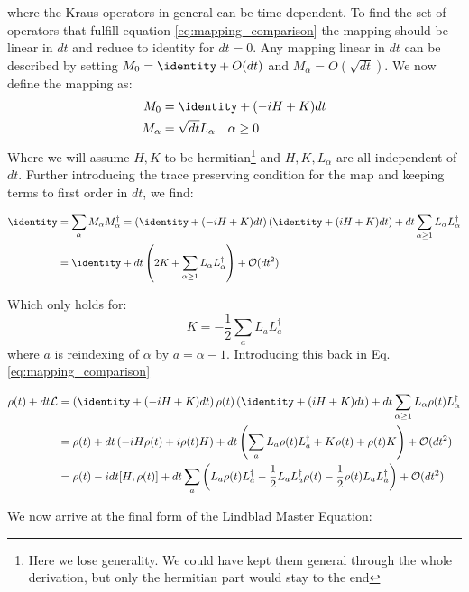 where the Kraus operators in general can be time-dependent. To find the set of operators that fulfill equation \ref{eq:mapping_comparison} the mapping should be linear in $dt$ and reduce to identity for $dt = 0$. Any mapping linear in $dt$ can be described by setting $M_0 = \identity + O(dt)$ and $M_\alpha = O(\sqrt{dt})$. We now define the mapping as:
\begin{align}
    M_0 &= \identity + (-iH + K)dt \\
    M_\alpha &= \sqrt{dt} L_\alpha \quad \alpha \geq 0
\end{align}
Where we will assume $H, K$ to be hermitian\footnote{Here we lose generality. We could have kept them general through the whole derivation, but only the hermitian part would stay to the end} and $H, K, L_\alpha$ are all independent of $dt$. Further introducing the trace preserving condition for the map and keeping terms to first order in $dt$, we find:
\begin{fullwidth}
\begin{align}
    \identity &= \sum_\alpha M_\alpha M_\alpha^\dagger = \left(\identity + (-iH + K)dt\right)\left(\identity + (iH + K)dt\right) + dt \sum_{\alpha \geq 1} L_\alpha L_\alpha^\dagger \\
    &= \identity + dt \left(2K +  \sum_{\alpha\geq 1} L_\alpha L_\alpha^\dagger\right) + \mathcal{O}(dt^2) 
\end{align}
\end{fullwidth}
Which only holds for:
\begin{equation}
    K = - \frac12 \sum_a L_a L_a^\dagger
\end{equation}
where $a$ is reindexing of $\alpha$ by $a = \alpha - 1$. Introducing this back in Eq. \ref{eq:mapping_comparison} 
\begin{fullwidth}
\begin{align}
    \rho(t) + dt \lindbladian &= \left(\identity + (-iH + K)dt\right)\rho(t)\left(\identity + (iH + K)dt\right) + dt \sum_{\alpha \geq 1} L_\alpha \rho(t) L_\alpha^\dagger \\
    &= \rho(t) + dt \left(-i H \rho(t) + i \rho(t) H\right) + dt \left(\sum_a L_a \rho(t) L_a^\dagger + K \rho(t) + \rho(t) K\right) + \mathcal{O}(dt^2) \\
    &= \rho(t) -i dt[H, \rho(t)] + dt \sum_a \left(L_a \rho(t) L_a^\dagger - \frac12 L_a L_a^\dagger \rho(t) - \frac12 \rho(t)L_a L_a^\dagger  \right) + \mathcal{O}(dt^2)
\end{align}
\end{fullwidth}
We now arrive at the final form of the Lindblad Master Equation:
